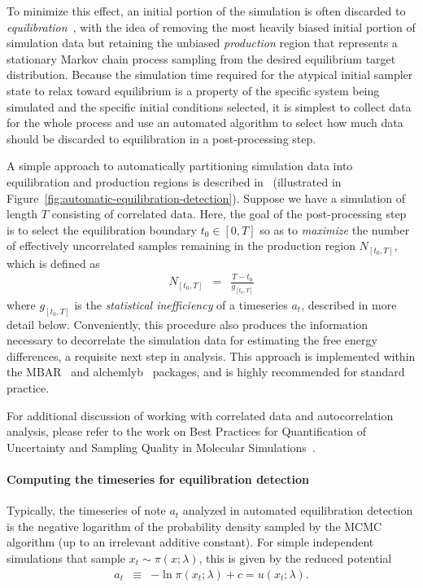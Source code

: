\documentclass[9pt,bestpractices]{livecoms}
\begin{document}
To minimize this effect, an initial portion of the simulation is often discarded to \emph{equilibration}~\cite{Braun:L:2019}, with the idea of removing the most heavily biased initial portion of simulation data but retaining the unbiased \emph{production} region that represents a stationary Markov chain process sampling from the desired equilibrium target distribution.
Because the simulation time required for the atypical initial sampler state to relax toward equilibrium is a property of the specific system being simulated and the specific initial conditions selected, it is simplest to collect data for the whole process and use an automated algorithm to select how much data should be discarded to equilibration in a post-processing step.

A simple approach to automatically partitioning simulation data into equilibration and production regions is described in~\cite{chodera2016simple} (illustrated in Figure~\ref{fig:automatic-equilibration-detection}).
Suppose we have a simulation of length $T$ consisting of correlated data.
Here, the goal of the post-processing step is to select the equilibration boundary $t_0 \in [0, T]$ so as to \emph{maximize} the number of effectively uncorrelated samples remaining in the production region $N_{[t_0,T]}$, which is defined as
\begin{eqnarray}
N_{[t_0,T]} &=& \frac{T - t_0}{g_{[t_0,T]}}
\end{eqnarray}
where $g_{[t_0,T]}$ is the \emph{statistical inefficiency} of a timeseries $a_t$, described in more detail below.
Conveniently, this procedure also produces the information necessary to decorrelate the simulation data for estimating the free energy differences, a requisite next step in analysis.
This approach is implemented within the MBAR~\cite{kylebeauchamp2019choderalab} and alchemlyb~\cite{daviddotson2019alchemistry} packages, and is highly recommended for standard practice.

For additional discussion of working with correlated data and autocorrelation analysis, please refer to the work on Best Practices for Quantification of Uncertainty and Sampling Quality in Molecular Simulations~\cite{Grossfield:L:2019}.

\paragraph{Computing the timeseries for equilibration detection}
Typically, the timeseries of note $a_t$ analyzed in automated equilibration detection is the negative logarithm of the probability density sampled by the MCMC algorithm (up to an irrelevant additive constant).
For simple independent simulations that sample $x_t \sim \pi(x ; \lambda)$, this is given by the reduced potential
\begin{eqnarray}
a_t &\equiv& - \ln \pi(x_t; \lambda) + c = u(x_t; \lambda) .
\end{eqnarray}
\end{document}
